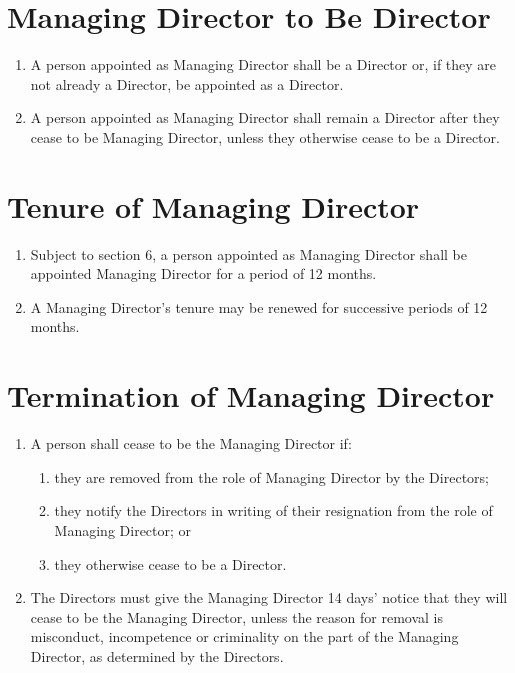 \documentclass[a4paper,10pt]{article}
\begin{document}
\section{Managing Director to Be Director}

\begin{enumerate}
    \item A person appointed as Managing Director shall be a Director or, if they are not already a Director, be appointed as a Director.
    \item A person appointed as Managing Director shall remain a Director after they cease to be Managing Director, unless they otherwise cease to be a Director.
\end{enumerate}


\section{Tenure of Managing Director}

\begin{enumerate}
    \item Subject to section 6, a person appointed as Managing Director shall be appointed Managing Director for a period of 12 months.
    \item A Managing Director's tenure may be renewed for successive periods of 12 months.
\end{enumerate}

\section{Termination of Managing Director}

\begin{enumerate}
    \item A person shall cease to be the Managing Director if:
    \begin{enumerate}
        \item they are removed from the role of Managing Director by the Directors;
        \item they notify the Directors in writing of their resignation from the role of Managing Director; or
        \item they otherwise cease to be a Director.
    \end{enumerate}
    \item The Directors must give the Managing Director 14 days' notice that they will cease to be the Managing Director, unless the reason for removal is misconduct, incompetence or criminality on the part of the Managing Director, as determined by the Directors.
\end{enumerate}
\end{document}
